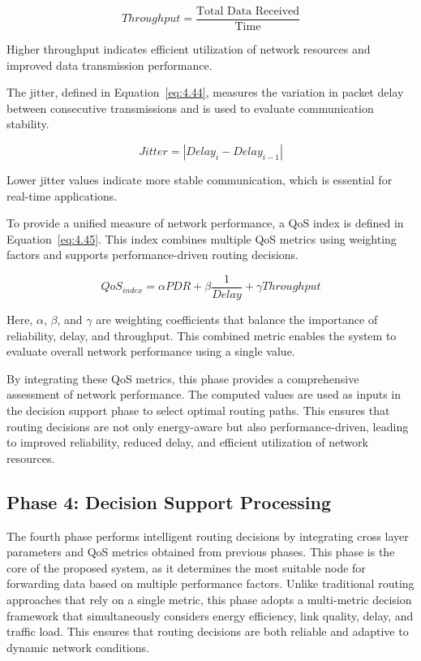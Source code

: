 \documentclass[a4paper,fleqn]{cas-dc}
\numberwithin{equation}{section}
\begin{document}
\begin{equation}
Throughput = \frac{\text{Total Data Received}}{\text{Time}}
\label{eq:4.43}
\end{equation}

Higher throughput indicates efficient utilization of network resources and improved data transmission performance.

The jitter, defined in Equation~\ref{eq:4.44}, measures the variation in packet delay between consecutive transmissions and is used to evaluate communication stability.

\begin{equation}
Jitter = |Delay_i - Delay_{i-1}|
\label{eq:4.44}
\end{equation}

Lower jitter values indicate more stable communication, which is essential for real-time applications.

To provide a unified measure of network performance, a QoS index is defined in Equation~\ref{eq:4.45}. This index combines multiple QoS metrics using weighting factors and supports performance-driven routing decisions.

\begin{equation}
QoS_{index} = \alpha PDR + \beta \frac{1}{Delay} + \gamma Throughput
\label{eq:4.45}
\end{equation}

Here, $\alpha$, $\beta$, and $\gamma$ are weighting coefficients that balance the importance of reliability, delay, and throughput. This combined metric enables the system to evaluate overall network performance using a single value.

By integrating these QoS metrics, this phase provides a comprehensive assessment of network performance. The computed values are used as inputs in the decision support phase to select optimal routing paths. This ensures that routing decisions are not only energy-aware but also performance-driven, leading to improved reliability, reduced delay, and efficient utilization of network resources.

\subsection{Phase 4: Decision Support Processing}

The fourth phase performs intelligent routing decisions by integrating cross layer parameters and QoS metrics obtained from previous phases. This phase is the core of the proposed system, as it determines the most suitable node for forwarding data based on multiple performance factors. Unlike traditional routing approaches that rely on a single metric, this phase adopts a multi-metric decision framework that simultaneously considers energy efficiency, link quality, delay, and traffic load. This ensures that routing decisions are both reliable and adaptive to dynamic network conditions.
\end{document}
